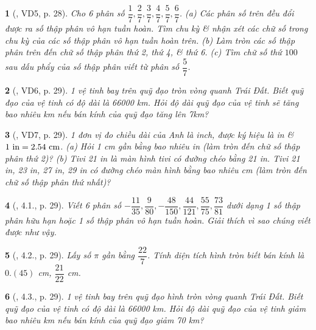 \documentclass{article}
\newtheorem{baitoan}{}
\begin{document}
\begin{baitoan}[\cite{Binh_boi_duong_Toan_7_tap_1}, VD5, p. 28]
	Cho 6 phân số $\dfrac{1}{7},\dfrac{2}{7},\dfrac{3}{7},\dfrac{4}{7},\dfrac{5}{7},\dfrac{6}{7}$. (a) Các phân số trên đều đổi được ra số thập phân vô hạn tuần hoàn. Tìm chu kỳ \& nhận xét các chữ số trong chu kỳ của các số thập phân vô hạn tuần hoàn trên. (b) Làm tròn các số thập phân trên đến chữ số thập phân thứ 2, thứ 4, \& thứ 6. (c) Tìm chữ số thứ $100$ sau dấu phẩy của số thập phân viết từ phân số $\dfrac{5}{7}$.
\end{baitoan}

\begin{baitoan}[\cite{Binh_boi_duong_Toan_7_tap_1}, VD6, p. 29]
	1 vệ tinh bay trên quỹ đạo tròn vòng quanh Trái Đất. Biết quỹ đạo của vệ tinh có độ dài là {\rm66000 km}. Hỏi độ dài quỹ đạo của vệ tinh sẽ tăng bao nhiêu {\rm km} nếu bán kính của quỹ đạo tăng lên {\rm7km}? 
\end{baitoan}

\begin{baitoan}[\cite{Binh_boi_duong_Toan_7_tap_1}, VD7, p. 29]
	1 đơn vị đo chiều dài của Anh là inch, được ký hiệu là {\rm in} \& $\rm1\ in = 2.54\ cm$. (a) Hỏi {\rm1 cm} gần bằng bao nhiêu {\rm in} (làm tròn đến chữ số thập phân thứ 2)? (b) Tivi {\rm21 in} là màn hình tivi có đường chéo bằng {\rm21 in}. Tivi {\rm21 in, 23 in, 27 in, 29 in} có đường chéo màn hình bằng bao nhiêu {\rm cm} (làm tròn đến chữ số thập phân thứ nhất)? 
\end{baitoan}

\begin{baitoan}[\cite{Binh_boi_duong_Toan_7_tap_1}, 4.1., p. 29]
	Viết 6 phân số $-\dfrac{11}{35},\dfrac{9}{80},-\dfrac{48}{150},\dfrac{44}{121},\dfrac{55}{75},\dfrac{73}{81}$ dưới dạng 1 số thập phân hữu hạn hoặc 1 số thập phân vô hạn tuần hoàn. Giải thích vì sao chúng viết được như vậy.
\end{baitoan}

\begin{baitoan}[\cite{Binh_boi_duong_Toan_7_tap_1}, 4.2., p. 29]
	Lấy số $\pi$ gần bằng $\dfrac{22}{7}$. Tính diện tích hình tròn biết bán kính là $0.(45)$ {\rm cm}, $\dfrac{21}{22}$ {\rm cm}.
\end{baitoan}

\begin{baitoan}[\cite{Binh_boi_duong_Toan_7_tap_1}, 4.3., p. 29]
	1 vệ tinh bay trên quỹ đạo hình tròn vòng quanh Trái Đất. Biết quỹ đạo của vệ tinh có độ dài là {\rm66000 km}. Hỏi độ dài quỹ đạo của vệ tinh giảm bao nhiêu {\rm km} nếu bán kính của quỹ đạo giảm {\rm70 km}?
\end{baitoan}
\end{document}
